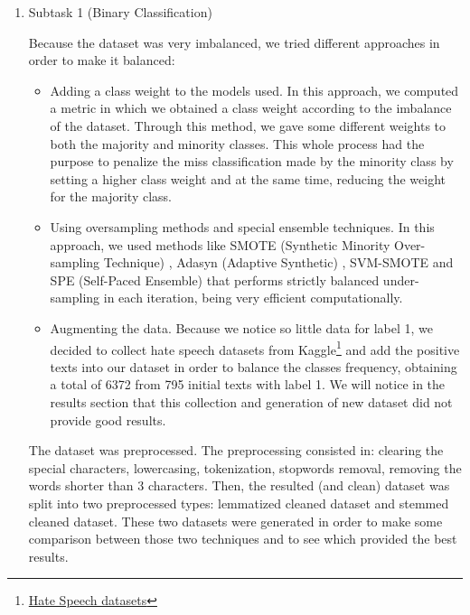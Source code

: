 \documentclass[11pt]{article}
\begin{document}
\begin{enumerate}

	\item Subtask 1 (Binary Classification)

	      Because the dataset was very imbalanced, we tried different approaches in
	      order to make it balanced:

	      \begin{itemize}
		      \item Adding a class weight to the models used. In this approach, we
		            computed a metric in which we obtained a class weight according to the
		            imbalance of the dataset. Through this method, we gave some different
		            weights to both the majority and minority classes. This whole process had
		            the purpose to penalize the miss classification made by the minority class by
		            setting a higher class weight and at the same time, reducing the weight for
		            the majority class.

		      \item Using oversampling methods and special ensemble techniques. In this
		            approach, we used methods like SMOTE (Synthetic Minority
		            Over-sampling Technique) \cite{Chawla_2002}, Adasyn (Adaptive Synthetic) \cite{4633969}, SVM-SMOTE \cite{7392251} and SPE (Self-Paced Ensemble) \cite{Liu_2020} that performs strictly balanced under-sampling in each
		            iteration, being very efficient computationally.

		      \item Augmenting the data. Because we notice so little data for label 1, we
		            decided to collect hate speech datasets from Kaggle\footnote{\href{https://www.kaggle.com/search?q=hate+speech+in\%3Adatasets}{Hate Speech datasets}} and add the positive texts into our
		            dataset in order to balance the classes frequency, obtaining a total of 6372
		            from 795 initial texts with label 1. We will notice in the results section
		            that this collection and generation of new dataset did not provide good
		            results.
	      \end{itemize}

	      The dataset was preprocessed. The preprocessing consisted in: clearing the special characters, lowercasing, tokenization, stopwords removal, removing the words shorter than 3 characters. Then, the resulted (and clean) dataset was split into two preprocessed
	      types: lemmatized cleaned dataset and stemmed cleaned dataset. These two
	      datasets were generated in order to make some comparison between those two
	      techniques and to see which provided the best results.


\end{enumerate}
\end{document}
